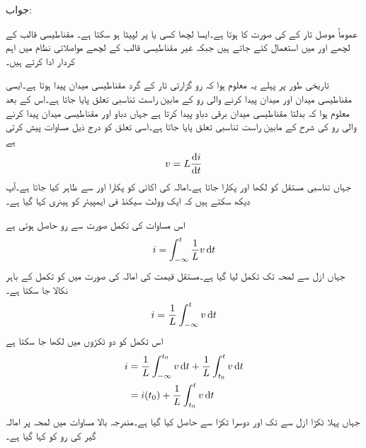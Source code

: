 جواب:

 عموماً موصل تار کے  کی صورت کا ہوتا ہے۔ایسا لچھا کسی  یا  پر لپیٹا ہو سکتا ہے۔ مقناطیسی قالب کے لچھے  اور  میں استعمال کئے جاتے ہیں جبکہ غیر مقناطیسی قالب کے لچھے مواصلاتی نظام میں اہم کردار ادا کرتے ہیں۔

تاریخی طور پر پہلے یہ معلوم ہوا کہ رو گزارتی تار کے گرد مقناطیسی میدان پیدا ہوتا ہے۔ایسی مقناطیسی میدان اور میدان پیدا کرنے والی رو کے مابین راست تناسبی تعلق پایا جاتا ہے۔اس کے بعد معلوم ہوا کہ بدلتا مقناطیسی میدان برقی دباو پیدا کرتا ہے جہاں دباو اور مقناطیسی میدان پیدا کرنے والی رو کی شرح کے مابین راست تناسبی تعلق پایا جاتا ہے۔اسی تعلق کو درج ذیل مساوات پیش کرتی ہے
\begin{align}\label{مساوات_امالہ_بنیادی_مساوات_امالہ_الف}
v=L \frac{\dif i}{\dif t}
\end{align}
جہاں تناسبی مستقل کو  لکھا اور  پکارا جاتا ہے۔امالہ کی اکائی کو  پکارا اور  سے ظاہر کیا جاتا ہے۔آپ دیکھ سکتے ہیں کہ ایک وولٹ سیکنڈ فی ایمپیئر  کو ہینری کہا گیا ہے۔ 

اس مساوات کی تکمل صورت سے رو حاصل ہوتی ہے
\begin{align}
i=\int_{-\infty}^{t}\frac{1}{L} v \dif t
\end{align}
جہاں ازل  سے لمحہ  تک تکمل لیا گیا ہے۔مستقل قیمت کی امالہ کی صورت میں  کو تکمل کے باہر نکالا جا سکتا ہے۔
\begin{align}
i=\frac{1}{L}\int_{-\infty}^{t} v \dif t
\end{align}
اس تکمل کو دو ٹکڑوں میں لکھا جا سکتا ہے 
\begin{gather}
\begin{aligned}
i&=\frac{1}{L}\int_{-\infty}^{t_0} v \dif t+\frac{1}{L} \int_{t_0}^{t} v \dif t\\
&=i(t_0)+\frac{1}{L} \int_{t_0}^{t} v \dif t
\end{aligned}
\end{gather}
جہاں پہلا ٹکڑا ازل سے  تک اور دوسرا ٹکڑا  سے  حاصل کیا گیا ہے۔مندرجہ بالا مساوات میں لمحہ  پر امالہ گیر کی رو کو  کہا گیا ہے۔

